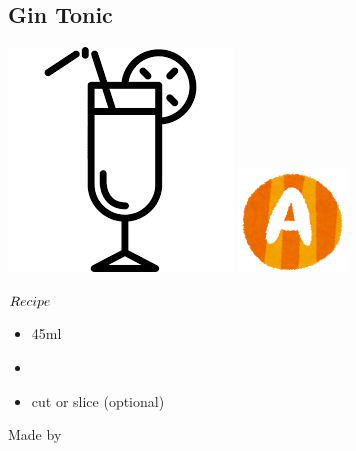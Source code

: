 \subsection{Gin Tonic}
\vspace{-7.6mm}
\hspace{36mm}
\includegraphics[scale=.07]{cocktail_glass_tall.png}
\includegraphics[scale=.12]{capital_a.png}
\vspace{2.5mm}
\begin{itembox}[l]{\boldmath $Recipe$}
\begin{itemize}
\setlength{\parskip}{0cm}
\setlength{\itemsep}{0cm}
\item \gin 45ml
\item \tw
\item \lime cut or slice (optional)
\end{itemize}
\vspace{-4mm}
Made by \build
\end{itembox}
